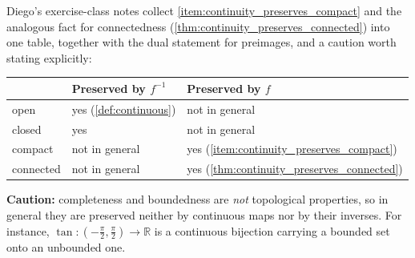 \begin{remark}
Diego's exercise-class notes collect \cref{item:continuity_preserves_compact} and the analogous
fact for connectedness (\cref{thm:continuity_preserves_connected}) into one table, together with
the dual statement for preimages, and a caution worth stating explicitly:
\begin{center}
\begin{tabular}{lll}
& \textbf{Preserved by $f^{-1}$} & \textbf{Preserved by $f$} \\
\hline
open & yes (\cref{def:continuous}) & not in general \\
closed & yes & not in general \\
compact & not in general & yes (\cref{item:continuity_preserves_compact}) \\
connected & not in general & yes (\cref{thm:continuity_preserves_connected}) \\
\end{tabular}
\end{center}
\textbf{Caution:} completeness and boundedness are \emph{not} topological properties, so in
general they are preserved neither by continuous maps nor by their inverses. For instance,
$\tan : (-\tfrac\pi2,\tfrac\pi2) \to \mathbb{R}$ is a continuous bijection carrying a bounded set
onto an unbounded one.
\end{remark}




